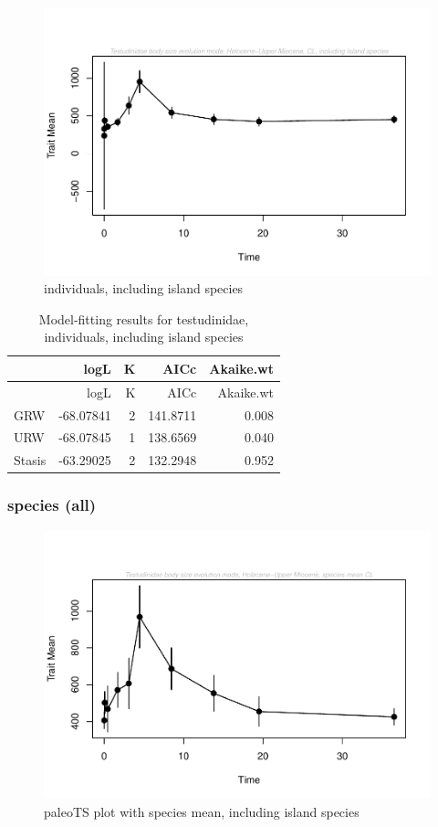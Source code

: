\documentclass[]{article}
\begin{document}
\begin{figure}[htbp]
\centering
\includegraphics{MA_JJ_files/figure-latex/paleoTS plot-1.pdf}
\caption{individuals, including island species}
\end{figure}

\begin{longtable}[]{@{}lrrrr@{}}
\caption{Model-fitting results for testudinidae, individuals, including
island species}\tabularnewline
\toprule
& logL & K & AICc & Akaike.wt\tabularnewline
\midrule
\endfirsthead
\toprule
& logL & K & AICc & Akaike.wt\tabularnewline
\midrule
\endhead
GRW & -68.07841 & 2 & 141.8711 & 0.008\tabularnewline
URW & -68.07845 & 1 & 138.6569 & 0.040\tabularnewline
Stasis & -63.29025 & 2 & 132.2948 & 0.952\tabularnewline
\bottomrule
\end{longtable}

\newpage

\subsubsection{species (all)}\label{species-all}

\begin{figure}[htbp]
\centering
\includegraphics{MA_JJ_files/figure-latex/paleoTS plot with species mean, including island species-1.pdf}
\caption{paleoTS plot with species mean, including island species}
\end{figure}
\end{document}
